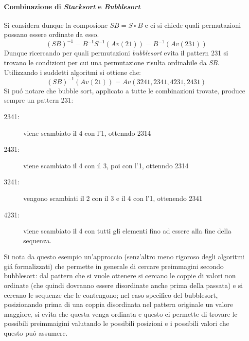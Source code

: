 \paragraph*{Combinazione di \textit{Stacksort} e \textit{Bubblesort}} Si considera dunque la composione $SB = S\circ{B}$ e ci si chiede quali permutazioni possano essere ordinate da esso.$$(SB)^{-1}=B^{-1}S^{-1}(Av(21))=B^{-1}(Av(231))$$
Dunque ricercando per quali permutazioni \textit{bubblesort} evita il pattern 231 si trovano le condizioni per cui una permutazione risulta ordinabile da \textit{SB}.\\
Utilizzando i suddetti algoritmi\cite{albert2010inverse} si ottiene che:$$(SB)^{-1}(Av(21))=Av(3241, 2341, 4231, 2431)$$
Si pu\'o notare che bubble sort, applicato a tutte le combinazioni trovate, produce sempre un pattern 231:
\begin{description}
\item[2341:] viene scambiato il 4 con l'1, ottenndo 2314
\item[2431:] viene scambiato il 4 con il 3, poi con l'1, ottenndo 2314
\item[3241:] vengono scambiati il 2 con il 3 e il 4 con l'1, ottenendo 2341
\item[4231:] viene scambiato il 4 con tutti gli elementi fino ad essere alla fine della sequenza.
\end{description}
Si nota da questo esempio un'approccio (senz'altro meno rigoroso degli algoritmi gi\'a formalizzati) che permette in generale di cercare preimmagini secondo bubblesort: dal pattern che si vuole ottenere si cercano le coppie di valori non ordinate (che quindi dovranno essere disordinate anche prima della passata) e si cercano le sequenze che le contengono; nel caso specifico del bubblesort, posizionando prima di una coppia disordinata nel pattern originale un valore maggiore, si evita che questa venga ordinata e questo ci permette di trovare le possibili preimmaigini valutando le possibili posizioni e i possibili valori che questo pu\'o assumere.
